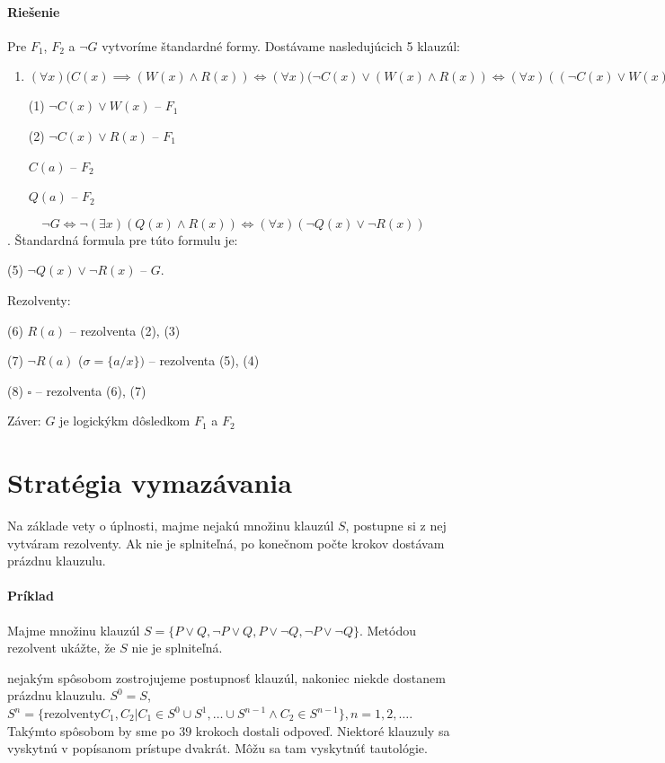 \paragraph{Riešenie} Pre $F_1$, $F_2$ a $\neg G$ vytvoríme štandardné formy.
Dostávame nasledujúcich 5 klauzúl:
\begin{enumerate}
	\item $(\forall x) (C(x) \implies (W(x) \land R(x)) \iff (\forall
	x)(\neg C(x) \lor (W(x)\land R(x)) \iff (\forall x) ((\neg C(x) \lor
	W(x)) \land (\neg C(x) \lor R(x)))$
	\par (1) $\neg C(x) \lor W(x)$ -- $F_1$
	\par (2) $\neg C(x) \lor R(x)$ -- $F_1$
	\par $C(a)$ -- $F_2$
	\par $Q(a)$ -- $F_2$
\end{enumerate}
$$\neg G \iff \neg (\exists x)(Q(x)\land R(x)) \iff (\forall x) (\neg Q(x) \lor
\neg R(x)) $$. Štandardná formula pre túto formulu je:
\par (5) $\neg Q(x) \lor \neg R(x)$ -- $G$.

\par Rezolventy: 
\par (6) $R(a)$ -- rezolventa (2), (3)
\par (7) $\neg R(a)$ ($\sigma = \{a / x \})$ -- rezolventa (5), (4)
\par (8) $\square$ -- rezolventa (6), (7)

\par Záver: $G$ je logickýkm dôsledkom $F_1$ a $F_2$

\section{Stratégia vymazávania}
Na základe vety o úplnosti, majme nejakú množinu klauzúl $S$, postupne si z nej
vytváram rezolventy. Ak nie je splniteľná, po konečnom počte krokov dostávam
prázdnu klauzulu.

\paragraph{Príklad} Majme množinu klauzúl $S=\{P\lor Q, \neg P\lor Q, P \lor
\neg Q, \neg P \lor \neg Q\}$. Metódou rezolvent ukážte, že $S$ nie je
splniteľná.

\par nejakým spôsobom zostrojujeme postupnosť klauzúl, nakoniec niekde dostanem
prázdnu klauzulu. 
$S^0 = S$, $S^n = \{ \mbox{rezolventy} C_1, C_2 | C_1 \in S^0 \cup S^1,
\ldots \cup S^{n-1} \land C_2 \in S^{n-1}\}, n=1, 2, \ldots$. Takýmto spôsobom
by sme po $39$ krokoch dostali odpoveď. Niektoré klauzuly sa vyskytnú v
popísanom prístupe dvakrát. Môžu sa tam vyskytnúť tautológie.



